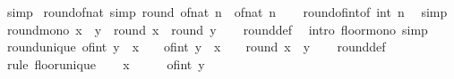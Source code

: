 \begin{isabellebody}
\ simp%
\endisatagproof
{\isafoldproof}%
%
\isadelimproof
\isanewline
%
\endisadelimproof
\isanewline
{}\isamarkupfalse%
\ round{\isacharunderscore}{\kern0pt}of{\isacharunderscore}{\kern0pt}nat\ {\isacharbrackleft}{\kern0pt}simp{\isacharbrackright}{\kern0pt}{\isacharcolon}{\kern0pt}\ {\isachardoublequoteopen}round\ {\isacharparenleft}{\kern0pt}of{\isacharunderscore}{\kern0pt}nat\ n{\isacharparenright}{\kern0pt}\ {\isacharequal}{\kern0pt}\ of{\isacharunderscore}{\kern0pt}nat\ n{\isachardoublequoteclose}\isanewline
%
\isadelimproof
\ \ %
\endisadelimproof
%
\isatagproof
{}\isamarkupfalse%
\ round{\isacharunderscore}{\kern0pt}of{\isacharunderscore}{\kern0pt}int{\isacharbrackleft}{\kern0pt}of\ {\isachardoublequoteopen}int\ n{\isachardoublequoteclose}{\isacharbrackright}{\kern0pt}\ \isamarkupfalse%
\ simp%
\endisatagproof
{\isafoldproof}%
%
\isadelimproof
\isanewline
%
\endisadelimproof
\isanewline
{}\isamarkupfalse%
\ round{\isacharunderscore}{\kern0pt}mono{\isacharcolon}{\kern0pt}\ {\isachardoublequoteopen}x\ {\isasymle}\ y\ {\isasymLongrightarrow}\ round\ x\ {\isasymle}\ round\ y{\isachardoublequoteclose}\isanewline
%
\isadelimproof
\ \ %
\endisadelimproof
%
\isatagproof
{}\isamarkupfalse%
\ round{\isacharunderscore}{\kern0pt}def\ \isamarkupfalse%
\ {\isacharparenleft}{\kern0pt}intro\ floor{\isacharunderscore}{\kern0pt}mono{\isacharparenright}{\kern0pt}\ simp%
\endisatagproof
{\isafoldproof}%
%
\isadelimproof
\isanewline
%
\endisadelimproof
\isanewline
{}\isamarkupfalse%
\ round{\isacharunderscore}{\kern0pt}unique{\isacharcolon}{\kern0pt}\ {\isachardoublequoteopen}of{\isacharunderscore}{\kern0pt}int\ y\ {\isachargreater}{\kern0pt}\ x\ {\isacharminus}{\kern0pt}\ {}{\isacharslash}{\kern0pt}{}\ {\isasymLongrightarrow}\ of{\isacharunderscore}{\kern0pt}int\ y\ {\isasymle}\ x\ {\isacharplus}{\kern0pt}\ {}{\isacharslash}{\kern0pt}{}\ {\isasymLongrightarrow}\ round\ x\ {\isacharequal}{\kern0pt}\ y{\isachardoublequoteclose}\isanewline
%
\isadelimproof
\ \ %
\endisadelimproof
%
\isatagproof
{}\isamarkupfalse%
\ round{\isacharunderscore}{\kern0pt}def\isanewline
{}\isamarkupfalse%
\ {\isacharparenleft}{\kern0pt}rule\ floor{\isacharunderscore}{\kern0pt}unique{\isacharparenright}{\kern0pt}\isanewline
\ \ \isamarkupfalse%
\ {\isachardoublequoteopen}x\ {\isacharminus}{\kern0pt}\ {}\ {\isacharslash}{\kern0pt}\ {}\ {\isacharless}{\kern0pt}\ of{\isacharunderscore}{\kern0pt}int\ y{\isachardoublequoteclose}\isanewline

\end{isabellebody}
